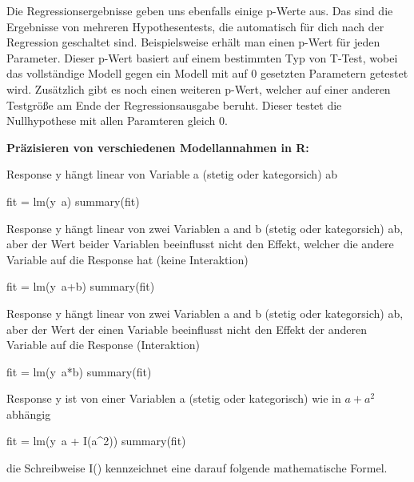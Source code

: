 \documentclass[a4paper,twoside]{tufte-book}\usepackage[]{graphicx}\usepackage[]{color}
\begin{document}
Die Regressionsergebnisse geben uns ebenfalls einige p-Werte aus. Das sind die Ergebnisse von mehreren Hypothesentests, die automatisch für dich nach der Regression geschaltet sind. Beispielsweise erhält man einen p-Wert für jeden Parameter. Dieser p-Wert basiert auf einem bestimmten Typ von T-Test, wobei das vollständige Modell gegen ein Modell mit auf 0 gesetzten Parametern getestet wird. Zusätzlich gibt es noch einen weiteren p-Wert, welcher auf einer anderen Testgröße am Ende der Regressionsausgabe beruht. Dieser testet die Nullhypothese mit allen Paramteren gleich 0.

\vspace{1cm}
\begin{fullwidth}
\begin{mdframed}
    
\textbf{Präzisieren von verschiedenen Modellannahmen in R:} 

Response y hängt linear von Variable a (stetig oder kategorsich) ab

\begin{Schunk}
\begin{Sinput}
fit = lm(y~a)
summary(fit)
\end{Sinput}
\end{Schunk}

Response y hängt linear von zwei Variablen a and b (stetig oder kategorsich) ab, aber der Wert beider Variablen beeinflusst nicht den Effekt, welcher die andere Variable auf die Response hat (keine Interaktion)

\begin{Schunk}
\begin{Sinput}
fit = lm(y~a+b)
summary(fit)
\end{Sinput}
\end{Schunk}

Response y hängt linear von zwei Variablen a and b (stetig oder kategorsich) ab, aber der Wert der einen Variable beeinflusst nicht den Effekt der anderen Variable auf die Response (Interaktion)

\begin{Schunk}
\begin{Sinput}
fit = lm(y~a*b)
summary(fit)
\end{Sinput}
\end{Schunk}

Response y ist von einer Variablen a (stetig oder kategorisch) wie in $a + a^2$ abhängig

\begin{Schunk}
\begin{Sinput}
fit = lm(y~a + I(a^2))
summary(fit)
\end{Sinput}
\end{Schunk}

die Schreibweise I() kennzeichnet eine darauf folgende mathematische Formel. 

\end{mdframed}
\end{fullwidth}
\end{document}
